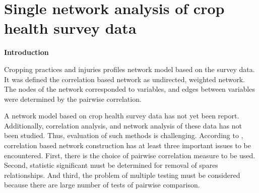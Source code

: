 
\section*{Single network analysis of crop health survey data}
\textbf{Introduction}

Cropping practices and injuries profiles network model based on the survey data. It was defined the correlation based network as undirected, weighted network. The nodes of the network corresponded to variables, and edges between variables were determined by the pairwise correlation.

A network model based on crop health survey data has not yet been report. Additionally, correlation analysis, and network analysis of these data has not been studied. Thus, evaluation of such methods is challenging. According to , correlation based network construction has at least three important issues to be encountered. First, there is the choice of pairwise correlation measure to be used. Second, statistic significant must be determined for removal of spares relationships. And third, the problem of multiple testing must be considered because there are large number of tests of pairwise comparison.



